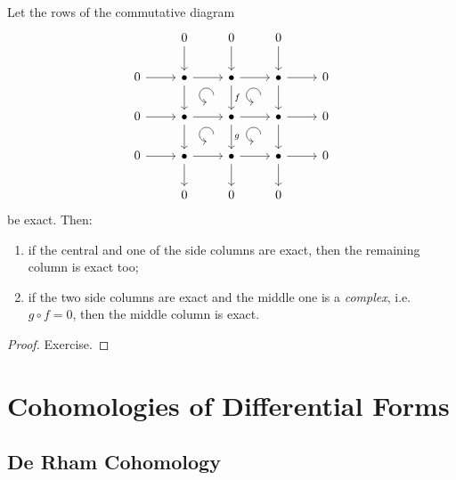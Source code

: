 \documentclass[english,letterpaper]{article}%
\numberwithin{equation}{section}
\numberwithin{figure}{section}
\numberwithin{table}{section}
\theoremstyle{definition}
\theoremstyle{definition}
\theoremstyle{definition}
\theoremstyle{plain}
\theoremstyle{plain}
\theoremstyle{plain}
\theoremstyle{plain}
\theoremstyle{remark}
\theoremstyle{remark}
\begin{document}
\begin{lem}\label{3x3-lemma}
    Let the rows of the commutative diagram
    \[\begin{tikzcd}[every matrix/.append style={name=m},   
        execute at end picture={\draw [<-] ([xshift=-7mm,yshift=-9mm]m-2-3.north) arc[start angle=-90,delta angle=-270,radius=0.2cm];
        \draw [<-] ([xshift=-7mm,yshift=-9mm]m-2-4.north) arc[start angle=-90,delta angle=-270,radius=0.2cm];
        \draw [<-] ([xshift=-7mm,yshift=-9mm]m-3-3.north) arc[start angle=-90,delta angle=-270,radius=0.2cm];
        \draw [<-] ([xshift=-7mm,yshift=-9mm]m-3-4.north) arc[start angle=-90,delta angle=-270,radius=0.2cm];}]
        &0\arrow[d]&0\arrow[d]&0\arrow[d]&\\
        0\arrow[r]& \bullet \arrow[r]\arrow[d] & \bullet\arrow[r]\arrow[d,"f"] & \bullet \arrow[r]\arrow[d] & 0\\
        0\arrow[r]& \bullet \arrow[r]\arrow[d] & \bullet\arrow[r]\arrow[d,"g"] & \bullet \arrow[r]\arrow[d] & 0\\
       0\arrow[r]& \bullet\arrow[r]\arrow[d] & \bullet\arrow[r]\arrow[d] & \bullet\arrow[r]\arrow[d] &0\\
       &0&0&0&
    \end{tikzcd}\]
    be exact. Then:
    \begin{enumerate}
        \item if the central and one of the side columns are exact, then the remaining column is exact too;
        \item if the two side columns are exact and the middle one is a \emph{complex}, i.e.\ $g\circ f=0$, then the middle column is exact.
    \end{enumerate}
\end{lem}
\begin{proof}
    Exercise.
\end{proof}








\section{Cohomologies of Differential Forms}

\subsection{De Rham Cohomology}
\end{document}

